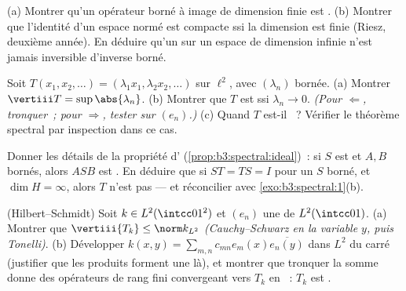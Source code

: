 \begin{exercise}[$\star$]\label{exo:b3:spectral:1}
(a) Montrer qu'un opérateur borné à image de dimension finie
est .
(b) Montrer que l'identité d'un espace normé est compacte ssi
la dimension est finie (Riesz, deuxième année). En déduire
qu'un  sur un espace de dimension infinie
n'est jamais inversible d'inverse borné.
\end{exercise}

\begin{exercise}[$\star$]\label{exo:b3:spectral:2}
Soit $T(x_1, x_2, \dots) = (\lambda_1x_1, \lambda_2x_2,
\dots)$ sur $\ell^2$, avec $(\lambda_n)$ bornée.
(a) Montrer $\vertiii T = \sup\abs{\lambda_n}$.
(b) Montrer que $T$ est  ssi $\lambda_n \to 0$.
\emph{(Pour $\Leftarrow$, tronquer~; pour $\Rightarrow$,
tester sur $(e_n)$.)}
(c) Quand $T$ est-il ~? Vérifier le théorème
spectral par inspection dans ce cas.
\end{exercise}

\begin{exercise}[$\star\star$]\label{exo:b3:spectral:3}
Donner les détails de la propriété d'
(\cref{prop:b3:spectral:ideal})~: si $S$ est  et $A,
B$ bornés, alors $ASB$ est . En déduire que si $ST =
TS = I$ pour un $S$ borné, et $\dim H = \infty$, alors $T$
n'est pas  --- et réconcilier avec
\cref{exo:b3:spectral:1}(b).
\end{exercise}

\begin{exercise}[$\star\star$]\label{exo:b3:spectral:4}
(Hilbert--Schmidt) Soit $k \in L^2(\intcc01^2)$ et $(e_n)$ une
 de $L^2(\intcc01)$.
(a) Montrer que $\vertiii{T_k} \leq \norm k_{L^2}$
\emph{(Cauchy--Schwarz en la variable $y$, puis Tonelli)}.
(b) Développer $k(x,y) = \sum_{m,n}c_{mn}e_m(x)\overline{e_n(y)}$
dans $L^2$ du carré (justifier que les produits forment une
 là), et montrer que tronquer la somme donne
des opérateurs de rang fini convergeant vers $T_k$ en ~: $T_k$ est .
\end{exercise}

